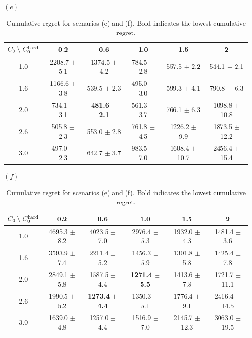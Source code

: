 \documentclass[aos,preprint]{imsart}
\theoremstyle{plain}
\theoremstyle{definition}
\begin{document}
\begin{table}[!t]
\caption{Cumulative regret for scenarios (e) and (f). Bold indicates the lowest cumulative regret.} \label{table: bandit sensitivity}
\centering
$(e)$
\begin{tabular}{c|ccccc}
$C_0\;\backslash \; C_0^{\textup{hard}}$ & 0.2          & 0.6          & 1.0           & 1.5           & 2             \\ \hline
1.0   & 2208.7 $\pm$ 5.1 & 1374.5 $\pm$ 4.2 & 784.5 $\pm$ 2.8 & 557.5 $\pm$ 2.2   & 544.1 $\pm$ 2.1   \\
1.6 & 1166.6 $\pm$ 3.8 & 539.5 $\pm$ 2.3  & 495.0 $\pm$ 3.0     & 599.3 $\pm$ 4.1   & 790.8 $\pm$ 6.3   \\
2.0   & 734.1 $\pm$ 3.1  & \textbf{481.6 $\pm$ 2.1}  & 561.3 $\pm$ 3.7 & 766.1 $\pm$ 6.3   & 1098.8 $\pm$ 10.8 \\
2.6 & 505.8 $\pm$ 2.3  & 553.0 $\pm$ 2.8    & 761.8 $\pm$ 4.5 & 1226.2 $\pm$ 9.9  & 1873.5 $\pm$ 12.2 \\
3.0   & 497.0 $\pm$ 2.3    & 642.7 $\pm$ 3.7  & 983.5 $\pm$ 7.0   & 1608.4 $\pm$ 10.7 & 2456.4 $\pm$ 15.4  
\end{tabular} 

\medskip

$(f)$
\begin{tabular}{c|ccccc}
\hline
$C_0\;\backslash \; C_0^{\textup{hard}}$ & 0.2          & 0.6          & 1.0            & 1.5           & 2            \\ \hline
1.0   & 4695.3 $\pm$ 8.2 & 4023.5 $\pm$ 7.0   & 2976.4 $\pm$ 5.3 & 1932.0 $\pm$ 4.3    & 1481.4 $\pm$ 3.6  \\
1.6 & 3593.9 $\pm$ 7.4 & 2211.4 $\pm$ 5.2 & 1456.3 $\pm$ 5.9 & 1301.8 $\pm$ 5.8  & 1425.4 $\pm$ 7.8  \\
2.0   & 2849.1 $\pm$ 5.8 & 1587.5 $\pm$ 4.4 & \textbf{1271.4 $\pm$ 5.5} & 1413.6 $\pm$ 7.8  & 1721.7 $\pm$ 11.1 \\
2.6 & 1990.5 $\pm$ 5.2 & \textbf{1273.4 $\pm$ 4.4} & 1350.3 $\pm$ 5.1 & 1776.4 $\pm$ 9.1  & 2416.4 $\pm$ 14.5 \\
3.0   & 1639.0 $\pm$ 4.8   & 1257.0 $\pm$ 4.4   & 1516.9 $\pm$ 7.0   & 2145.7 $\pm$ 12.3 & 3063.0 $\pm$ 19.5     
\end{tabular}
\end{table}
\end{document}
